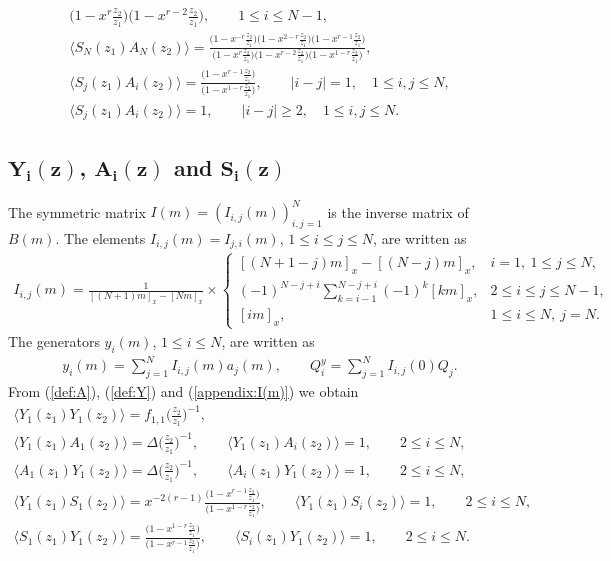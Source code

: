 \documentclass[pdftex]{sigma}
\numberwithin{equation}{section}
\begin{document}
\begin{gather}
{\big(1-x^{r}\frac{z_2}{z_1}\big)\big(1-x^{r-2}\frac{z_2}{z_1}\big)},\qquad
1\leq i \leq N-1,\nonumber
\\
\langle S_N(z_1)A_N(z_2)\rangle=\frac{
\big(1-x^{-r}\frac{z_2}{z_1}\big)\big(1-x^{2-r}\frac{z_2}{z_1}\big)
\big(1-x^{r-1}\frac{z_2}{z_1}\big)}{
\big(1-x^{r}\frac{z_2}{z_1}\big)\big(1-x^{r-2}\frac{z_2}{z_1}\big)
\big(1-x^{1-r}\frac{z_2}{z_1}\big)},\nonumber
\\
\langle S_j(z_1)A_i(z_2)\rangle=\frac{\big(1-x^{r-1}\frac{z_2}{z_1}\big)}{
\big(1-x^{1-r}\frac{z_2}{z_1}\big)},\qquad |i-j|=1,\quad 1\leq i,j \leq N,\nonumber
\\
\langle S_j(z_1)A_i(z_2)\rangle=1,\qquad |i-j|\geq 2,\quad 1\leq i,j \leq N.
\label{appendix:SA}
\end{gather}

\subsection[\protect{$Y\_\{i\}(z)$}, \protect{$A\_\{i\}(z)$} and \protect{$S\_\{i\}(z)$}]
{$\boldsymbol{Y_i(z)}$, $\boldsymbol{A_i(z)}$ and $\boldsymbol{S_i(z)}$}
The symmetric matrix $I(m)=(I_{i,j}(m))_{i,j=1}^N$ is the inverse matrix of $B(m)$.
The elements $I_{i,j}(m)=I_{j,i}(m)$, $1\leq i \leq j \leq N$, are written as
\begin{gather*}
I_{i, j}(m)=\frac{1}{[(N\!+\!1)m]_x-[Nm]_x}
\times \begin{cases}
[(N+1-j)m]_x-[(N-j)m]_x, &i=1,\ 1\leq j \leq N,
\\[1ex]
(-1)^{N-j+i}\displaystyle\sum_{k=i-1}^{N-j+i}(-1)^k [km]_x,
&2\leq i \leq j \leq N-1,
\\[1ex]
[i m]_x,&1\leq i \leq N,\ j=N.
\end{cases}
\label{appendix:I(m)}
\end{gather*}
The generators $y_i(m)$, $1\leq i \leq N$, are written as
\begin{gather}
y_i(m)=\sum_{j=1}^N I_{i,j}(m)a_j(m),\qquad
Q_i^y=\sum_{j=1}^N I_{i,j}(0)Q_j.
\label{eqn:y(m)}
\end{gather}
From (\ref{def:A}), (\ref{def:Y}) and (\ref{appendix:I(m)}) we obtain
\begin{gather}
\langle Y_1(z_1)Y_1(z_2)\rangle=f_{1,1}\bigg(\frac{z_2}{z_1}\bigg)^{-1},\nonumber
\\
\langle Y_1(z_1)A_1(z_2)\rangle =\Delta\bigg(\frac{z_2}{z_1}\bigg)^{-1},\qquad
\langle Y_1(z_1)A_i(z_2)\rangle=1,\qquad 2\leq i \leq N,\nonumber
\\
\langle A_1(z_1)Y_1(z_2)\rangle=\Delta\bigg(\frac{z_2}{z_1}\bigg)^{-1},\qquad
\langle A_i(z_1)Y_1(z_2)\rangle=1,\qquad 2\leq i \leq N,\nonumber
\\
\langle Y_1(z_1)S_1(z_2)\rangle =x^{-2(r-1)}\frac{\big(1-x^{r-1}\frac{z_2}{z_1}\big)}{\big(1-x^{1-r}\frac{z_2}{z_1}\big)},\qquad
\langle Y_1(z_1)S_i(z_2)\rangle=1,\qquad 2\leq i \leq N,
\nonumber
\\
\langle S_1(z_1)Y_1(z_2)\rangle
=\frac{\big(1-x^{1-r}\frac{z_2}{z_1}\big)}{\big(1-x^{r-1}\frac{z_2}{z_1}\big)},\qquad
\langle S_i(z_1)Y_1(z_2)\rangle =1,\qquad 2\leq i \leq N.
\label{appendix:Y}
\end{gather}
\end{document}
